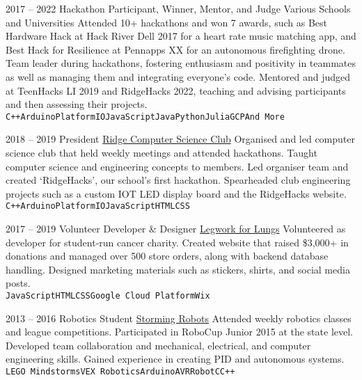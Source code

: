 \documentclass[9pt]{developercv} %
\begin{document}
\begin{entrylist}
	\entry
	{2017 -- 2022}
	{Hackathon Participant, Winner, Mentor, and Judge}
	{Various Schools and Universities}
	{
	  Attended 10+ hackathons and won 7 awards, such as Best Hardware Hack at Hack River Dell 2017 for a heart rate music matching app, and Best Hack for Resilience at Pennapps XX for an autonomous firefighting drone.
	  Team leader during hackathons, fostering enthusiasm and positivity in teammates as well as managing them and integrating everyone’s code.
	  Mentored and judged at TeenHacks LI 2019 and RidgeHacks 2022, teaching and advising participants and then assessing their projects.
\\
		\texttt{C++}\slashsep\texttt{Arduino}\slashsep\texttt{PlatformIO}\slashsep\texttt{JavaScript}\slashsep\texttt{Java}\slashsep\texttt{Python}\slashsep\texttt{Julia}\slashsep\texttt{GCP}\slashsep\texttt{And More}
	}

	\entry
	{2018 -- 2019}
	{President}
	{\href{https://ridgecompsci.club}{Ridge Computer Science Club}}
	{
		Organised and led computer science club that held weekly meetings and attended hackathons.
		Taught computer science and engineering concepts to members.
		Led organiser team and created ‘RidgeHacks’, our school’s first hackathon.
		Spearheaded club engineering projects such as a custom IOT LED display board and the RidgeHacks website.
		\\
		\texttt{C++}\slashsep\texttt{Arduino}\slashsep\texttt{PlatformIO}\slashsep\texttt{JavaScript}\slashsep\texttt{HTML}\slashsep\texttt{CSS}
	}

	\entry
	{2017 -- 2019}
	{Volunteer Developer \& Designer}
	{\href{http://www.legworkforlungs.org}{Legwork for Lungs}}
	{
		Volunteered as developer for student-run cancer charity.
		Created website that raised \$3,000+ in donations and managed over 500 store orders, along with backend database handling.
		Designed marketing materials such as stickers, shirts, and social media posts.
		\\
		\texttt{JavaScript}\slashsep\texttt{HTML}\slashsep\texttt{CSS}\slashsep\texttt{Google Cloud Platform}\slashsep\texttt{Wix}
	}

	\entry
	{2013 -- 2016}
	{Robotics Student}
	{\href{https://stormingrobots.com/prod/default.html}{Storming Robots}}
	{
		Attended weekly robotics classes and league competitions.
		Participated in RoboCup Junior 2015 at the state level.
		Developed team collaboration and mechanical, electrical, and computer engineering skills.
		Gained experience in creating PID and autonomous systems.
		\\
		\texttt{LEGO Mindstorms}\slashsep\texttt{VEX Robotics}\slashsep\texttt{Arduino}\slashsep\texttt{AVR}\slashsep\texttt{RobotC}\slashsep\texttt{C++}
	}

\end{entrylist}
\end{document}
